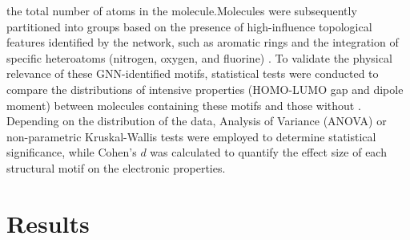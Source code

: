 \documentclass[]{article}
\begin{document}
the total number of atoms in the molecule.Molecules were subsequently partitioned into groups based on the presence of high-influence topological features identified by the network, such as aromatic rings and the integration of specific heteroatoms (nitrogen, oxygen, and fluorine) \citep{esders2024analyzingatomicinteractionsmolecules,polat2025understandingcapabilitiesmoleculargraph}. To validate the physical relevance of these GNN-identified motifs, statistical tests were conducted to compare the distributions of intensive properties (HOMO-LUMO gap and dipole moment) between molecules containing these motifs and those without \citep{gilmer2017neuralmessagepassingquantum,choi2022scalabletraininggraphconvolutional}. Depending on the distribution of the data, Analysis of Variance (ANOVA) or non-parametric Kruskal-Wallis tests were employed to determine statistical significance, while Cohen's $d$ was calculated to quantify the effect size of each structural motif on the electronic properties.

\section{Results}
\label{sec:results}
\end{document}

